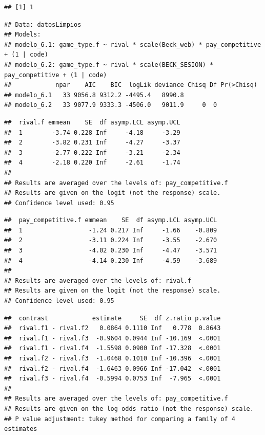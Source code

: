 \documentclass[
]{article}
\begin{document}
\begin{verbatim}
## [1] 1
\end{verbatim}

\begin{verbatim}
## Data: datosLimpios
## Models:
## modelo_6.1: game_type.f ~ rival * scale(Beck_web) * pay_competitive + (1 | code)
## modelo_6.2: game_type.f ~ rival * scale(BECK_SESION) * pay_competitive + (1 | code)
##            npar    AIC    BIC  logLik deviance Chisq Df Pr(>Chisq)
## modelo_6.1   33 9056.8 9312.2 -4495.4   8990.8                    
## modelo_6.2   33 9077.9 9333.3 -4506.0   9011.9     0  0
\end{verbatim}

\begin{verbatim}
##  rival.f emmean    SE  df asymp.LCL asymp.UCL
##  1        -3.74 0.228 Inf     -4.18     -3.29
##  2        -3.82 0.231 Inf     -4.27     -3.37
##  3        -2.77 0.222 Inf     -3.21     -2.34
##  4        -2.18 0.220 Inf     -2.61     -1.74
## 
## Results are averaged over the levels of: pay_competitive.f 
## Results are given on the logit (not the response) scale. 
## Confidence level used: 0.95
\end{verbatim}

\begin{verbatim}
##  pay_competitive.f emmean    SE  df asymp.LCL asymp.UCL
##  1                  -1.24 0.217 Inf     -1.66    -0.809
##  2                  -3.11 0.224 Inf     -3.55    -2.670
##  3                  -4.02 0.230 Inf     -4.47    -3.571
##  4                  -4.14 0.230 Inf     -4.59    -3.689
## 
## Results are averaged over the levels of: rival.f 
## Results are given on the logit (not the response) scale. 
## Confidence level used: 0.95
\end{verbatim}

\begin{verbatim}
##  contrast            estimate     SE  df z.ratio p.value
##  rival.f1 - rival.f2   0.0864 0.1110 Inf   0.778  0.8643
##  rival.f1 - rival.f3  -0.9604 0.0944 Inf -10.169  <.0001
##  rival.f1 - rival.f4  -1.5598 0.0900 Inf -17.328  <.0001
##  rival.f2 - rival.f3  -1.0468 0.1010 Inf -10.396  <.0001
##  rival.f2 - rival.f4  -1.6463 0.0966 Inf -17.042  <.0001
##  rival.f3 - rival.f4  -0.5994 0.0753 Inf  -7.965  <.0001
## 
## Results are averaged over the levels of: pay_competitive.f 
## Results are given on the log odds ratio (not the response) scale. 
## P value adjustment: tukey method for comparing a family of 4 estimates
\end{verbatim}
\end{document}
